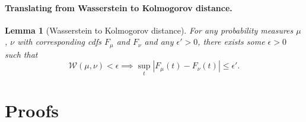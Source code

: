 \documentclass{article}
\newcommand{\abs}[1]{\left \lvert #1 \right \rvert}
\theoremstyle{alden}
\newtheorem{lemma}{Lemma}
\theoremstyle{definition}
\theoremstyle{remark}
\begin{document}
\paragraph{Translating from Wasserstein to Kolmogorov distance.}

\begin{lemma}[Wasserstein to Kolmogorov distance]
	\label{lem: wass_to_ks_distance}
	For any probability measures $\mu$, $\nu$ with corresponding cdfs $F_{\mu}$ and $F_{\nu}$ and any $\epsilon' > 0$, there exists some $\epsilon > 0$ such that
	\begin{equation*}
	\mathcal{W}(\mu, \nu ) < \epsilon \implies \sup_{t} \abs{F_{\mu}(t) - F_{\nu}(t)} \leq \epsilon'.
	\end{equation*}
\end{lemma}

\section{Proofs}
\end{document}
